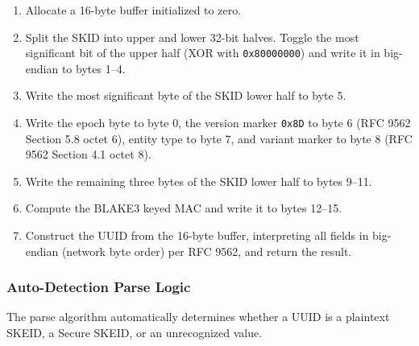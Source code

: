 \documentclass[fleqn,10pt,lineno]{wlpeerj}
\providecommand{\tightlist}{%
  \setlength{\itemsep}{0pt}\setlength{\parskip}{0pt}}
\begin{document}
\begin{enumerate}
\def\labelenumi{\arabic{enumi}.}
\tightlist
\item
  Allocate a 16-byte buffer initialized to zero.
\item
  Split the SKID into upper and lower 32-bit halves. Toggle the most
  significant bit of the upper half (XOR with \texttt{0x80000000}) and
  write it in big-endian to bytes 1--4.
\item
  Write the most significant byte of the SKID lower half to byte 5.
\item
  Write the epoch byte to byte 0, the version marker \texttt{0x8D} to
  byte 6 (RFC 9562 Section 5.8 octet 6), entity type to byte 7, and
  variant marker to byte 8 (RFC 9562 Section 4.1 octet 8).
\item
  Write the remaining three bytes of the SKID lower half to bytes 9--11.
\item
  Compute the BLAKE3 keyed MAC and write it to bytes 12--15.
\item
  Construct the UUID from the 16-byte buffer, interpreting all fields in
  big-endian (network byte order) per RFC 9562, and return the result.
\end{enumerate}

\subsubsection{Auto-Detection Parse
Logic}\label{auto-detection-parse-logic}

The parse algorithm automatically determines whether a UUID is a
plaintext SKEID, a Secure SKEID, or an unrecognized value.
\end{document}
